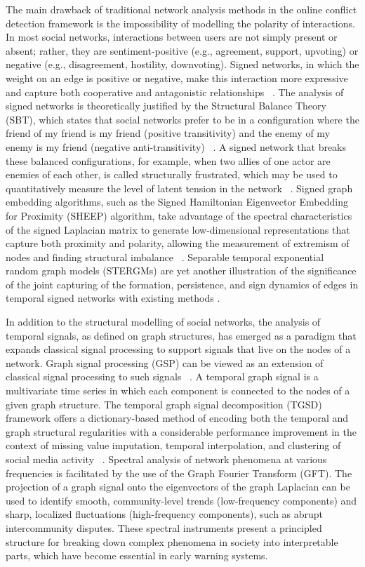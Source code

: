 \documentclass[a4paper,fleqn]{cas-dc}
\begin{document}
The main drawback of traditional network analysis methods in the online conflict detection framework is the impossibility of modelling the polarity of interactions. In most social networks, interactions between users are not simply present or absent; rather, they are sentiment-positive (e.g., agreement, support, upvoting) or negative (e.g., disagreement, hostility, downvoting). Signed networks, in which the weight on an edge is positive or negative, make this interaction more expressive and capture both cooperative and antagonistic relationships ~\cite{12_Babul2024, 13_caimo2026}. The analysis of signed networks is theoretically justified by the Structural Balance Theory (SBT), which states that social networks prefer to be in a configuration where the friend of my friend is my friend (positive transitivity) and the enemy of my enemy is my friend (negative anti-transitivity) ~\cite{13_caimo2026}. A signed network that breaks these balanced configurations, for example, when two allies of one actor are enemies of each other, is called structurally frustrated, which may be used to quantitatively measure the level of latent tension in the network ~\cite{12_Babul2024}. 
Signed graph embedding algorithms, such as the Signed Hamiltonian Eigenvector Embedding for Proximity (SHEEP) algorithm, take advantage of the spectral characteristics of the signed Laplacian matrix to generate low-dimensional representations that capture both proximity and polarity, allowing the measurement of extremism of nodes and finding structural imbalance ~\cite{12_Babul2024}.
Separable temporal exponential random graph models (STERGMs) are yet another illustration of the significance of the joint capturing of the formation, persistence, and sign dynamics of edges in temporal signed networks with existing methods \cite{13_caimo2026}.

In addition to the structural modelling of social networks, the analysis of temporal signals, as defined on graph structures, has emerged as a paradigm that expands classical signal processing to support signals that live on the nodes of a network. Graph signal processing (GSP) can be viewed as an extension of classical signal processing to such signals ~\cite{1_Mcneil2021}. A temporal graph signal is a multivariate time series in which each component is connected to the nodes of a given graph structure. The temporal graph signal decomposition (TGSD) framework offers a dictionary-based method of encoding both the temporal and graph structural regularities with a considerable performance improvement in the context of missing value imputation, temporal interpolation, and clustering of social media activity ~\cite{1_Mcneil2021}. Spectral analysis of network phenomena at various frequencies is facilitated by the use of the Graph Fourier Transform (GFT). The projection of a graph signal onto the eigenvectors of the graph Laplacian can be used to identify smooth, community-level trends (low-frequency components) and sharp, localized fluctuations (high-frequency components), such as abrupt intercommunity disputes. These spectral instruments present a principled structure for breaking down complex phenomena in society into interpretable parts, which have become essential in early warning systems.
\end{document}
